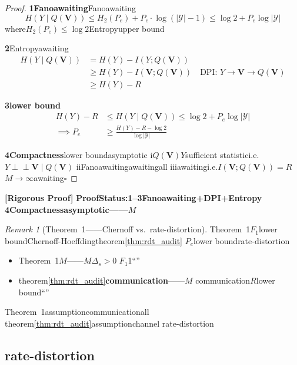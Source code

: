 \documentclass[11pt,a4paper]{article}
\theoremstyle{remark}
\newtheorem{remark}[theorem]{Remark}
\newcommand{\Y}{\mathcal{Y}}
\newcommand{\indep}{\perp\!\!\!\perp}
\newcommand{\rigorous}{\textnormal{\textbf{[Rigorous Proof]}}}
\begin{document}
\begin{proof}
\textbf{1Fanoawaiting}Fanoawaiting\cite{cover2006}
\begin{equation}
    H(Y \mid Q(\mathbf{V})) \leq H_2(P_e) + P_e \cdot \log(|\Y| - 1)
    \leq \log 2 + P_e \log |\Y|
\end{equation}
where$H_2(P_e) \leq \log 2$Entropyupper bound

\textbf{2}Entropyawaiting
\begin{align}
    H(Y \mid Q(\mathbf{V}))
    &= H(Y) - I(Y; Q(\mathbf{V})) \\
    &\geq H(Y) - I(\mathbf{V}; Q(\mathbf{V})) \quad \text{DPI: } Y \to \mathbf{V} \to Q(\mathbf{V}) \text{}\\
    &\geq H(Y) - R \quad \text{}
\end{align}

\textbf{3lower bound}
\begin{align}
    H(Y) - R &\leq H(Y \mid Q(\mathbf{V}))
    \leq \log 2 + P_e \log |\Y| \\
    \implies P_e &\geq \frac{H(Y) - R - \log 2}{\log |\Y|}
\end{align}

\textbf{4Compactness}lower boundasymptotic
i$Q(\mathbf{V})$$Y$sufficient statistici.e.$Y \indep \mathbf{V} \mid Q(\mathbf{V})$
iiFanoawaitingawaitingall
iiiawaitingi.e.$I(\mathbf{V}; Q(\mathbf{V})) = R$
$M \to \infty$awaiting\hfill $\square$
\end{proof}

\rigorous{} \textbf{ProofStatus:1--3Fanoawaiting+DPI+Entropy
4Compactnessasymptotic——$M$}

\begin{remark}[Theorem~1——Chernoff vs.\ rate-distortion]
\label{rem:chernoff_vs_rdt}
Theorem~1$F_1$lower boundChernoff-Hoeffdingtheorem\ref{thm:rdt_audit}
$P_e$lower boundrate-distortion
\begin{itemize}
    \item Theorem~1\textbf{$M$}——$M$$\Delta_s > 0$
          $F_1$1``''
    \item theorem\ref{thm:rdt_audit}\textbf{communication}——$M$
          communication$R$lower bound``''
\end{itemize}
Theorem~1assumptioncommunicationall
theorem\ref{thm:rdt_audit}assumptionchannel
rate-distortion
\end{remark}

\subsection{rate-distortion}
\end{document}
